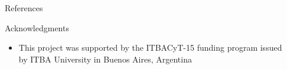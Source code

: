 \documentclass[final,hyperref={pdfpagelabels=false}]{beamer}
\begin{document}
\begin{frame}[t]
\begin{columns}[t]
\begin{column}{.465\textwidth}
\begin{block}{References}

\end{block}


\begin{block}{Acknowledgments}

\begin{itemize}
\item This project was supported by the ITBACyT-15 funding program issued by ITBA University in Buenos Aires, Argentina
\end{itemize}

\end{block}



%
%


\end{column} %

\begin{column}{.015\textwidth}\end{column} %

\end{columns} %

\end{frame} %
\end{document}

